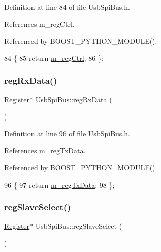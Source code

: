 Definition at line 84 of file Usb\+Spi\+Bus.\+h.



References m\+\_\+reg\+Ctrl.



Referenced by B\+O\+O\+S\+T\+\_\+\+P\+Y\+T\+H\+O\+N\+\_\+\+M\+O\+D\+U\+L\+E().


\begin{DoxyCode}
84                       \{
85     \textcolor{keywordflow}{return} \hyperlink{classUsbSpiBus_abcd2ac59f2bb4ea5b97ff98f2b7659da}{m\_regCtrl};
86   \};
\end{DoxyCode}
\mbox{\label{classUsbSpiBus_adb0c94f37c7e6008ed4540efa94559b3}} 
\subsubsection{\texorpdfstring{reg\+Rx\+Data()}{regRxData()}}
{\footnotesize\ttfamily \hyperlink{classRegister}{Register}$\ast$ Usb\+Spi\+Bus\+::reg\+Rx\+Data (\begin{DoxyParamCaption}{ }\end{DoxyParamCaption})\hspace{0.3cm}{\ttfamily [inline]}}



Definition at line 96 of file Usb\+Spi\+Bus.\+h.



References m\+\_\+reg\+Tx\+Data.



Referenced by B\+O\+O\+S\+T\+\_\+\+P\+Y\+T\+H\+O\+N\+\_\+\+M\+O\+D\+U\+L\+E().


\begin{DoxyCode}
96                         \{
97     \textcolor{keywordflow}{return} \hyperlink{classUsbSpiBus_ae4b9ec4d035b9a507735b28dba04556c}{m\_regTxData};
98   \};
\end{DoxyCode}
\mbox{\label{classUsbSpiBus_a9bc70ad9842d8aa8f89b24599bfd6238}} 
\subsubsection{\texorpdfstring{reg\+Slave\+Select()}{regSlaveSelect()}}
{\footnotesize\ttfamily \hyperlink{classRegister}{Register}$\ast$ Usb\+Spi\+Bus\+::reg\+Slave\+Select (\begin{DoxyParamCaption}{ }\end{DoxyParamCaption})\hspace{0.3cm}{\ttfamily [inline]}}



